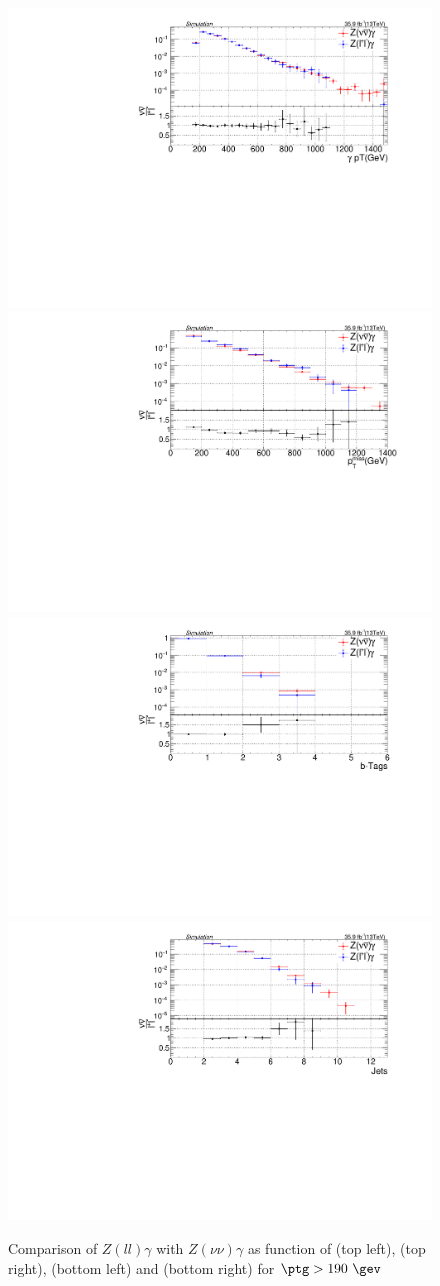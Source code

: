 \begin{figure}[h!]
\centering
\includegraphics[width=0.48\linewidth]{../Figures/Chap3/zgamma/BestPhotonPtNuNu_LL_LO.pdf}
\includegraphics[width=0.48\linewidth]{../Figures/Chap3/zgamma/METNuNu_LL_LO.pdf}\\
\includegraphics[width=0.48\linewidth]{../Figures/Chap3/zgamma/nBTagsNuNu_LL_LO.pdf}
\includegraphics[width=0.48\linewidth]{../Figures/Chap3/zgamma/nHadJetsNuNu_LL_LO.pdf}
\caption[Comparing $Z(ll)\gamma$ with $Z(\nu\nu)\gamma$]{Comparison of $Z(ll)\gamma$ with $Z(\nu\nu)\gamma$ as function of \ptg (top left), \ptmiss (top right), \nb (bottom left) and \nj (bottom right) for $\ptg>190\ \gev$}
\label{fig:ZGTF}
\end{figure}

